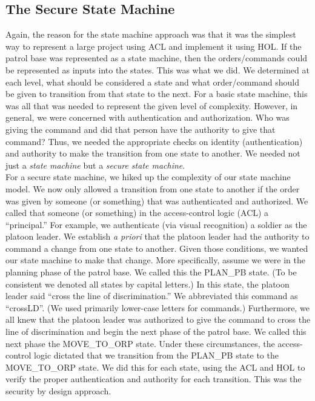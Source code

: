 \subsection{The Secure State Machine}
\label{sec:secure-state-machine-2}

Again, the reason for the state machine approach was that it was the simplest
way to represent a large project using ACL and implement it using HOL. If the
patrol base was represented as a state machine, then the orders/commands could
be represented as inputs into the states. This was what we did. We determined
at each level, what should be considered a state and what order/command should
be given to transition from that state to the next. For a basic state machine,
this was all that was needed to represent the given level of complexity.
However, in general, we were concerned with authentication and authorization.
Who was giving the command and did that person have the authority to give that
command? Thus, we needed the appropriate checks on identity (authentication)
and authority to make the transition from one state to another. We needed not
just a \textit{state machine} but a \textit{secure state machine}.\\

For a secure state machine, we hiked up the complexity of our state machine model.
We now only allowed a transition from one state to another if the order was given by
someone (or something) that was authenticated and authorized. We called that someone
(or something) in the access-control logic (ACL) a “principal.” For example, we
authenticate (via visual recognition) a soldier as the platoon leader. We establish
\textit{a priori} that the platoon leader had the authority to command a change from one
state to another. Given those conditions, we wanted our state machine to make that
change. More specifically, assume we were in the planning phase of the patrol base.
We called this the PLAN_PB state. (To be consistent we denoted all states by capital
letters.) In this state, the platoon leader said “cross the line of discrimination.”
We abbreviated this command as “crossLD”. (We used primarily lower-case letters for
commands.) Furthermore, we all knew that the platoon leader was authorized to give the
command to cross the line of discrimination and begin the next phase of the patrol base.
We called this next phase the MOVE_TO_ORP state. Under these circumstances, the access-
control logic dictated that we transition from the PLAN_PB state to the MOVE_TO_ORP state.
We did this for each state, using the ACL and HOL to verify the proper authentication and
authority for each transition. This was the security by design approach.

